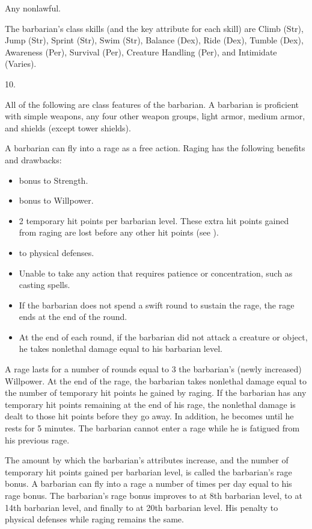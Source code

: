  Any nonlawful.

The barbarian's class skills (and the key attribute for each skill) are
Climb (Str), Jump (Str), Sprint (Str), Swim (Str), Balance (Dex), Ride (Dex), Tumble (Dex), Awareness (Per), Survival (Per), Creature Handling (Per), and Intimidate (Varies).

10.


All of the following are class features of the barbarian.
 A barbarian is proficient with simple weapons, any four other weapon groups, light armor, medium armor, and shields (except tower shields).

A barbarian can fly into a rage as a free action.
Raging has the following benefits and drawbacks:
\begin{itemize}
    \item {} bonus to Strength.
    \item {} bonus to Willpower.
    \item 2 temporary hit points per barbarian level.
        These extra hit points gained from raging are lost before any other hit points (see ).
    \item {} to physical defenses.
    \item Unable to take any action that requires patience or concentration, such as casting spells.
    \item If the barbarian does not spend a swift round to sustain the rage, the rage ends at the end of the round.
    \item At the end of each round, if the barbarian did not attack a creature or object, he takes nonlethal damage equal to his barbarian level.
\end{itemize}

A rage lasts for a number of rounds equal to 3 \add the barbarian's (newly increased) Willpower.
At the end of the rage, the barbarian takes nonlethal damage equal to the number of temporary hit points he gained by raging.
If the barbarian has any temporary hit points remaining at the end of his rage, the nonlethal damage is dealt to those hit points before they go away.
In addition, he becomes \fatigued until he rests for 5 minutes.
The barbarian cannot enter a rage while he is fatigued from his previous rage.

The amount by which the barbarian's attributes increase, and the number of temporary hit points gained per barbarian level, is called the barbarian's rage bonus.
A barbarian can fly into a rage a number of times per day equal to his rage bonus.
The barbarian's rage bonus improves to  at 8th barbarian level, to  at 14th barbarian level, and finally to  at 20th barbarian level.
His penalty to physical defenses while raging remains the same.

